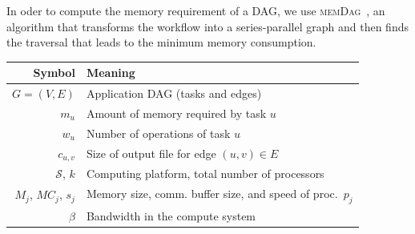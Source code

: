\documentclass[conference]{IEEEtran}
\newcommand{\algo}[1]{\textsc{#1}}
\newcommand{\parents}[1]{\,parent_{#1}}
\newcommand{\children}[1]{\,child_{#1}}
\newcommand{\cluster}{\,\mathcal{S}}
\begin{document}
In oder to compute the memory requirement of a DAG, we use \algo{memDag}~\cite{KAYAASLAN20181},
an algorithm that 
    transforms the workflow into a series-parallel graph
    and then finds the traversal that leads to the minimum memory consumption.

    \begin{table}
        \begin{center}
            \begin{tabular}{rl}
                \hline
                \textbf{Symbol}                       & \textbf{Meaning}                                         \\
                \hline
                $G = (V, E)$                          & Application DAG (tasks and edges)       \\
                $m_u$                                 & Amount of memory required by task $u$                                \\
                $w_u$                                 & Number of operations of task $u$         \\
                $c_{u,v}$                             & Size of output file for edge $(u,v)\in E$         \\
                $\cluster$, $k$                    & Computing platform, total number of processors           \\
                $M_j$, $MC_j$, $s_j$                               & Memory size, comm. buffer size, and speed of proc.\ $p_j$                          \\
                $\beta$                     & Bandwidth in the compute system                                \\

\end{tabular}
\end{center}
\end{table}
\end{document}
